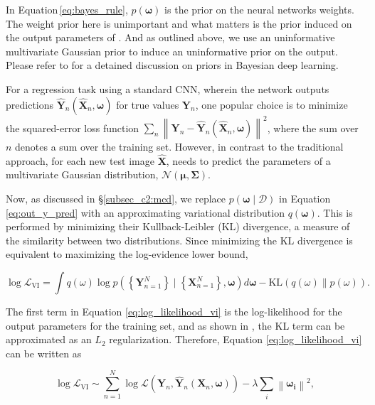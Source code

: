In Equation\,\ref{eq:bayes_rule}, $p(\boldsymbol{\omega})$ is the prior on the neural networks weights. The weight prior here is unimportant and what matters is the prior induced on the output parameters of \gampen{}. And as outlined above, we use an uninformative multivariate Gaussian prior to induce an uninformative prior on the output. Please refer to \cite{wilson_20} for a detained discussion on priors in Bayesian deep learning. 

For a regression task using a standard CNN, wherein the network outputs predictions  $\hat{\boldsymbol{Y}}_{n}\left(\boldsymbol{\hat{X}}_{n}, \boldsymbol{\omega}\right)$ for true values $\boldsymbol{Y}_{n}$, one popular choice is to minimize the squared-error loss function $\sum_{n} \left\|\boldsymbol{Y}_n-\boldsymbol{\hat{Y}}_n\left(\boldsymbol{\hat{X}}_n, \boldsymbol{\omega}\right)\right\|^{2}$, where the sum over $n$ denotes a sum over the training set. However, in contrast to the traditional approach, for each new test image $\boldsymbol{\hat{X}}$, \gampen{} needs to predict the parameters of a multivariate Gaussian distribution, $\mathcal{N}(\boldsymbol{\mu}, \boldsymbol{\Sigma})$. 

Now, as discussed in \S \ref{subsec_c2:mcd}, we replace $p(\boldsymbol{\omega} \mid \mathcal{D})$ in Equation \ref{eq:out_y_pred} with an approximating variational distribution $q(\boldsymbol{\omega})$. This is performed by minimizing their Kullback-Leibler (KL) divergence, a measure of the similarity between two distributions. Since minimizing the KL divergence is equivalent to maximizing the log-evidence lower bound,

\begin{equation}
\log \mathcal{L}_{\mathrm{VI}}= \int q(\omega) \log p( \left\{\boldsymbol{Y}_{n=1}^{N}\right\} \mid \left\{\boldsymbol{X}_{n=1}^N\right\}, \boldsymbol{\omega}) d \boldsymbol{\omega}  - \mathrm{KL}(q(\omega) \| p(\omega)) .
\label{eq:log_likelihood_vi}
\end{equation}

\noindent
The first term in Equation \ref{eq:log_likelihood_vi} is the log-likelihood for the output parameters for the training set, and as shown in \cite{gal_2016}, the KL term can be approximated as an $L_2$ regularization. Therefore, Equation \ref{eq:log_likelihood_vi} can be written as 

\begin{equation}
\log \mathcal{L}_{\mathrm{VI}} \sim \sum_{n=1}^{N} \log \mathcal{L}\left(\boldsymbol{Y}_{n}, \boldsymbol{\hat{Y}}_{n}\left(\boldsymbol{X}_{n}, \boldsymbol{\omega}\right)\right)-\lambda \sum_{i}\left\|\boldsymbol{\omega_{i}}\right\|^{2} ,
\label{eq:log_likelihood_vi_2}
\end{equation}

